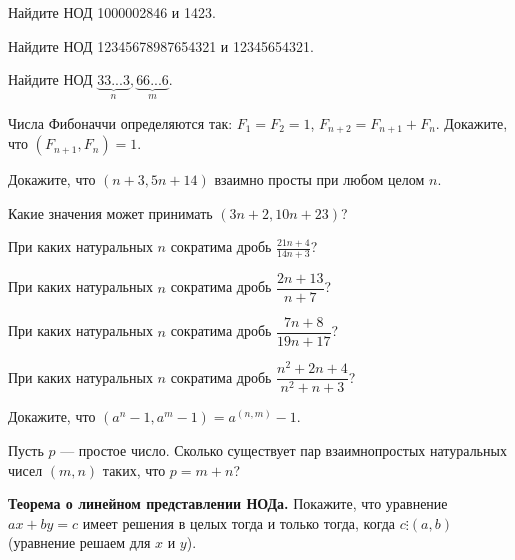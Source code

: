 \documentclass{article}
\begin{document}
    \begin{enumerate_boxed}

        \item Найдите НОД 1000002846 и 1423.

        \item Найдите НОД 12345678987654321 и 12345654321.

        \item Найдите НОД $\underbrace{33...3}_n, \underbrace{66...6}_m$.

        \item Числа Фибоначчи определяются так: $F_1 = F_2 = 1$, $F_{n+2} = F_{n+1} + F_n$. Докажите, что
        $(F_{n + 1}, F_n) = 1$.

        \item Докажите, что $(n + 3, 5n + 14)$ взаимно просты при любом целом $n$.

        \item Какие значения может принимать $(3n + 2, 10n + 23)$?

        \item При каких натуральных $n$ сократима дробь $\displaystyle \frac{21n + 4}{14n + 3}$?

        \item При каких натуральных $n$ сократима дробь $\dfrac{2n+13}{n+7}$?

        \item При каких натуральных $n$ сократима дробь $\dfrac{7n+8}{19n+17}$?

        \item При каких натуральных $n$ сократима дробь $\dfrac{n^2 +2n+4}{n^2 +n+3}$?

        \item Докажите, что $(a^n - 1, a^m - 1) = a^{(n, m)} - 1$.

        \item Пусть $p$ — простое число. Сколько существует пар взаимнопростых натуральных чисел $(m, n)$ таких, что $p = m + n$?

        \item \textbf{Теорема о линейном представлении НОДа.} Покажите, что уравнение $ax + by = c$ имеет решения в целых тогда и только тогда, когда $c \vdots (a, b)$(уравнение решаем для $x$ и $y$).

    \end{enumerate_boxed}
\end{document}
